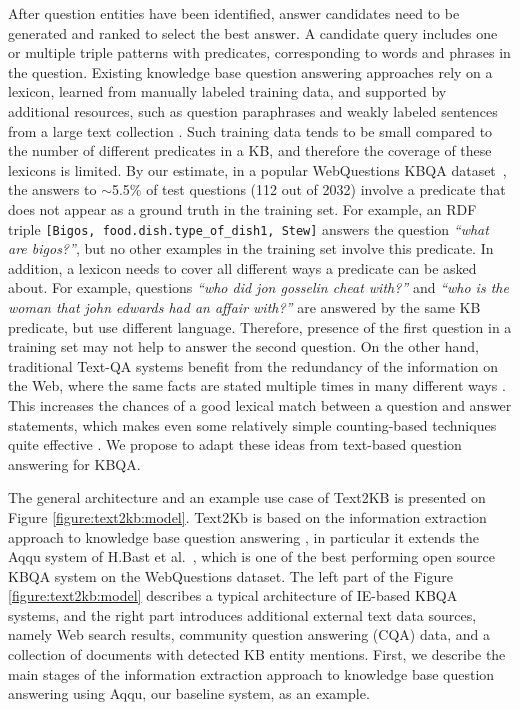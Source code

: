 After question entities have been identified, answer candidates need to be generated and ranked to select the best answer.
A candidate query includes one or multiple triple patterns with predicates, corresponding to words and phrases in the question.
Existing knowledge base question answering approaches \cite{bastmore:cikm:2015:aquu,BerantCFL13:sempre,BerantL14:parasempre,berant2015imitation,BordesCW14:emnlp,yao2014freebase} rely on a lexicon, learned from manually labeled training data, and supported by additional resources, such as question paraphrases \cite{BerantL14:parasempre} and weakly labeled sentences from a large text collection \cite{YaoD14}.
Such training data tends to be small compared to the number of different predicates in a KB, and therefore the coverage of these lexicons is limited.
By our estimate, in a popular WebQuestions KBQA dataset~\cite{BerantCFL13:sempre}, the answers to $\sim$5.5\% of test questions (112 out of 2032) involve a predicate that does not appear as a ground truth in the training set.
For example, an RDF triple \texttt{[Bigos, food.dish.type\_of\_dish1, Stew]} answers the question \textit{``what are bigos?''}, but no other examples in the training set involve this predicate.
In addition, a lexicon needs to cover all different ways a predicate can be asked about.
For example, questions \textit{``who did jon gosselin cheat with?''} and \textit{``who is the woman that john edwards had an affair with?''} are answered by the same KB predicate, but use different language.
Therefore, presence of the first question in a training set may not help to answer the second question.
On the other hand, traditional Text-QA systems benefit from the redundancy of the information on the Web, where the same facts are stated multiple times in many different ways \cite{lin2007exploration}.
This increases the chances of a good lexical match between a question and answer statements, which makes even some relatively simple counting-based techniques quite effective \cite{brill2002analysis}.
We propose to adapt these ideas from text-based question answering for KBQA.

The general architecture and an example use case of Text2KB is presented on Figure \ref{figure:text2kb:model}.
Text2Kb is based on the information extraction approach to knowledge base question answering \cite{YaoD14}, in particular it extends the Aqqu system of H.Bast et al.~\cite{bastmore:cikm:2015:aquu}, which is one of the best performing open source KBQA system on the WebQuestions dataset.
The left part of the Figure \ref{figure:text2kb:model} describes a typical architecture of IE-based KBQA systems, and the right part introduces additional external text data sources, namely Web search results, community question answering (CQA) data, and a collection of documents with detected KB entity mentions.
First, we describe the main stages of the information extraction approach to knowledge base question answering using Aqqu, our baseline system, as an example.

